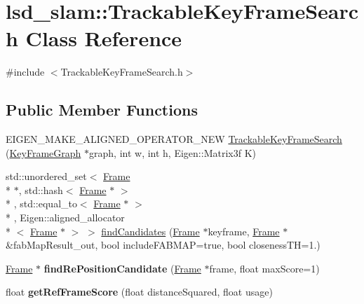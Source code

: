 \hypertarget{classlsd__slam_1_1_trackable_key_frame_search}{\section{lsd\-\_\-slam\-:\-:Trackable\-Key\-Frame\-Search Class Reference}
\label{classlsd__slam_1_1_trackable_key_frame_search}
}


{\ttfamily \#include $<$Trackable\-Key\-Frame\-Search.\-h$>$}

\subsection*{Public Member Functions}
\begin{DoxyCompactItemize}
\item 
E\-I\-G\-E\-N\-\_\-\-M\-A\-K\-E\-\_\-\-A\-L\-I\-G\-N\-E\-D\-\_\-\-O\-P\-E\-R\-A\-T\-O\-R\-\_\-\-N\-E\-W \hyperlink{classlsd__slam_1_1_trackable_key_frame_search_a41d0945dc6b44075e3c1f97ec9c794ca}{Trackable\-Key\-Frame\-Search} (\hyperlink{classlsd__slam_1_1_key_frame_graph}{Key\-Frame\-Graph} $\ast$graph, int w, int h, Eigen\-::\-Matrix3f K)
\item 
std\-::unordered\-\_\-set$<$ \hyperlink{classlsd__slam_1_1_frame}{Frame} \\*
$\ast$, std\-::hash$<$ \hyperlink{classlsd__slam_1_1_frame}{Frame} $\ast$ $>$\\*
, std\-::equal\-\_\-to$<$ \hyperlink{classlsd__slam_1_1_frame}{Frame} $\ast$ $>$\\*
, Eigen\-::aligned\-\_\-allocator\\*
$<$ \hyperlink{classlsd__slam_1_1_frame}{Frame} $\ast$ $>$ $>$ \hyperlink{classlsd__slam_1_1_trackable_key_frame_search_a7b90c891f259e6791e904d053bc64429}{find\-Candidates} (\hyperlink{classlsd__slam_1_1_frame}{Frame} $\ast$keyframe, \hyperlink{classlsd__slam_1_1_frame}{Frame} $\ast$\&fab\-Map\-Result\-\_\-out, bool include\-F\-A\-B\-M\-A\-P=true, bool closeness\-T\-H=1.)
\item 
\hypertarget{classlsd__slam_1_1_trackable_key_frame_search_a98f19cacc8134fcd162e4e3e4edc6bc0}{\hyperlink{classlsd__slam_1_1_frame}{Frame} $\ast$ {\bfseries find\-Re\-Position\-Candidate} (\hyperlink{classlsd__slam_1_1_frame}{Frame} $\ast$frame, float max\-Score=1)}\label{classlsd__slam_1_1_trackable_key_frame_search_a98f19cacc8134fcd162e4e3e4edc6bc0}

\item 
\hypertarget{classlsd__slam_1_1_trackable_key_frame_search_ada972e7c78a96121fab5ad847d414610}{float {\bfseries get\-Ref\-Frame\-Score} (float distance\-Squared, float usage)}\label{classlsd__slam_1_1_trackable_key_frame_search_ada972e7c78a96121fab5ad847d414610}

\end{DoxyCompactItemize}
